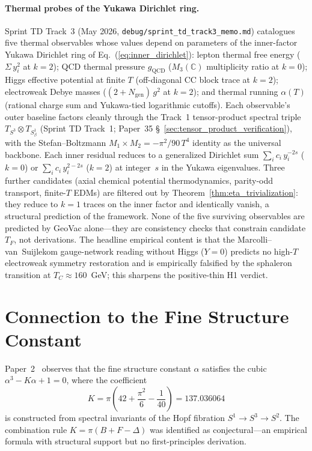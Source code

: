 \documentclass[aps,pra,twocolumn,superscriptaddress,longbibliography]{revtex4-2}
\begin{document}
\paragraph{Thermal probes of the Yukawa Dirichlet ring.}
Sprint TD Track~3 (May 2026,
\verb|debug/sprint_td_track3_memo.md|) catalogues five thermal
observables whose values depend on parameters of the inner-factor
Yukawa Dirichlet ring of Eq.~(\ref{eq:inner_dirichlet}): lepton
thermal free energy ($\Sigma\,y_i^2$ at $k=2$); QCD thermal pressure
$g_{\mathrm{QCD}}$ ($M_3(\mathbb{C})$ multiplicity ratio at $k=0$);
Higgs effective potential at finite $T$ (off-diagonal CC block
trace at $k=2$); electroweak Debye masses ($(2 + N_{\mathrm{gen}})\,g^2$
at $k=2$); and thermal running $\alpha(T)$ (rational charge sum and
Yukawa-tied logarithmic cutoffs).  Each observable's outer baseline
factors cleanly through the Track~1 tensor-product spectral triple
$T_{S^3}\otimes T_{S^1_\beta}$ (Sprint TD Track~1; Paper~35
\S~\ref{sec:tensor_product_verification}), with the Stefan--Boltzmann
$M_1\times M_2 = -\pi^2/90\,T^4$ identity as the universal backbone.
Each inner residual reduces to a generalized Dirichlet sum
$\sum_i c_i\, y_i^{-2s}$ ($k=0$) or $\sum_i c_i\, y_i^{2-2s}$ ($k=2$)
at integer~$s$ in the Yukawa eigenvalues.  Three further candidates
(axial chemical potential thermodynamics, parity-odd transport,
finite-$T$ EDMs) are filtered out by Theorem~\ref{thm:eta_trivialization}:
they reduce to $k=1$ traces on the inner factor and identically
vanish, a structural prediction of the framework.  None of the five
surviving observables are predicted by GeoVac alone---they are
consistency checks that constrain candidate $T_F$, not derivations.
The headline empirical content is that the Marcolli--van~Suijlekom
gauge-network reading without Higgs ($Y = 0$) predicts no high-$T$
electroweak symmetry restoration and is empirically falsified by the
sphaleron transition at $T_C \approx 160$~GeV; this sharpens the
positive-thin H1 verdict.



\section{Connection to the Fine Structure Constant}
\label{sec:alpha}

Paper~2~\cite{loutey_paper2} observes that the fine structure
constant $\alpha$ satisfies the cubic $\alpha^3 - K\alpha + 1 = 0$,
where the coefficient
\begin{equation}
  K = \pi\!\left(42 + \frac{\pi^2}{6} - \frac{1}{40}\right)
  = 137.036064
  \label{eq:K}
\end{equation}
is constructed from spectral invariants of the Hopf fibration
$S^1 \to S^3 \to S^2$.  The combination rule
$K = \pi(B + F - \Delta)$ was identified as conjectural---an
empirical formula with structural support but no first-principles
derivation.
\end{document}

